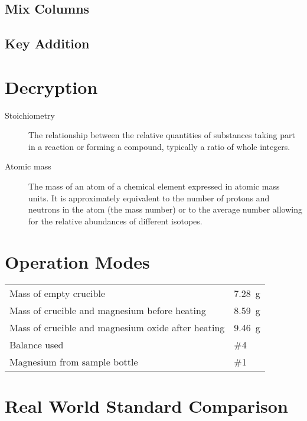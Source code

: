 \documentclass{article}
\begin{document}
\subsection{Mix Columns}

\subsection{Key Addition }


\section{Decryption}
\label{definitions}
\begin{description}
\item[Stoichiometry]
The relationship between the relative quantities of substances taking part in a reaction or forming a compound, typically a ratio of whole integers.
\item[Atomic mass]
The mass of an atom of a chemical element expressed in atomic mass units. It is approximately equivalent to the number of protons and neutrons in the atom (the mass number) or to the average number allowing for the relative abundances of different isotopes. 
\end{description} 
 

\section{Operation Modes}

\begin{tabular}{ll}
Mass of empty crucible & \SI{7.28}{\gram}\\
Mass of crucible and magnesium before heating & \SI{8.59}{\gram}\\
Mass of crucible and magnesium oxide after heating & \SI{9.46}{\gram}\\
Balance used & \#4\\
Magnesium from sample bottle & \#1
\end{tabular}


\section{Real World Standard Comparison}
\end{document}
